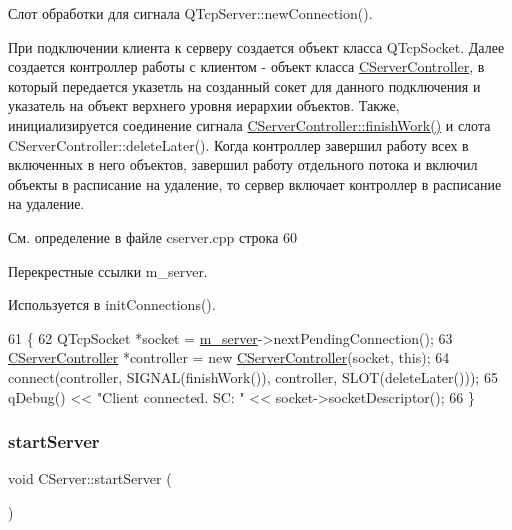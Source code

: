 Слот обработки для сигнала Q\+Tcp\+Server\+::new\+Connection(). 

При подключении клиента к серверу создается объект класса Q\+Tcp\+Socket. Далее создается контроллер работы с клиентом -\/ объект класса \hyperlink{class_c_server_controller}{C\+Server\+Controller}, в который передается указетль на созданный сокет для данного подключения и указатель на объект верхнего уровня иерархии объектов. Также, инициализируется соединение сигнала \hyperlink{class_c_server_controller_a49ac8bb325430fc9112056d862c5c117}{C\+Server\+Controller\+::finish\+Work()} и слота C\+Server\+Controller\+::delete\+Later(). Когда контроллер завершил работу всех в включенных в него объектов, завершил работу отдельного потока и включил объекты в расписание на удаление, то сервер включает контроллер в расписание на удаление. 

См. определение в файле cserver.\+cpp строка 60



Перекрестные ссылки m\+\_\+server.



Используется в init\+Connections().


\begin{DoxyCode}
61 \{
62     QTcpSocket *socket = \hyperlink{class_c_server_a0ee5b734ddfc86fc181e767700f7a46b}{m\_server}->nextPendingConnection();
63     \hyperlink{class_c_server_controller}{CServerController} *controller = \textcolor{keyword}{new} \hyperlink{class_c_server_controller}{CServerController}(socket, \textcolor{keyword}{this});
64     connect(controller, SIGNAL(finishWork()), controller, SLOT(deleteLater()));
65     qDebug() << \textcolor{stringliteral}{"Client connected. SC: "} << socket->socketDescriptor();
66 \}
\end{DoxyCode}
\hypertarget{class_c_server_adbc93cef317eac86a09a0b7067c96cc1}{}\label{class_c_server_adbc93cef317eac86a09a0b7067c96cc1} 
\subsubsection{\texorpdfstring{start\+Server}{startServer}}
{\footnotesize\ttfamily void C\+Server\+::start\+Server (\begin{DoxyParamCaption}{ }\end{DoxyParamCaption})\hspace{0.3cm}{\ttfamily [slot]}}



